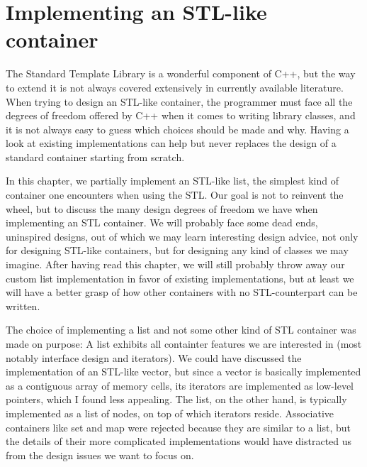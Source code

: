 \chapter{Implementing an STL-like container}
The Standard Template Library is a wonderful component of C++, but the way to extend it is not always covered extensively in currently available literature. When trying to design an STL-like container, the programmer must face all the degrees of freedom offered by C++ when it comes to writing library classes, and it is not always easy to guess which choices should be made and why. Having a look at existing implementations can help but never replaces the design of a standard container starting from scratch.

In this chapter, we partially implement an STL-like list, the simplest kind of container one encounters when using the STL. Our goal is not to reinvent the wheel, but to discuss the many design degrees of freedom we have when implementing an STL container. We will probably face some dead ends, uninspired designs, out of which we may learn interesting design advice, not only for designing STL-like containers, but for designing any kind of classes we may imagine. After having read this chapter, we will still probably throw away our custom list implementation in favor of existing implementations, but at least we will have a better grasp of how other containers with no STL-counterpart can be written.

The choice of implementing a list and not some other kind of STL container was made on purpose: A list exhibits all containter features we are interested in (most notably interface design and iterators). We could have discussed the implementation of an STL-like vector, but since a vector is basically implemented as a contiguous array of memory cells, its iterators are implemented as low-level pointers, which I found less appealing. The list, on the other hand, is typically implemented as a list of nodes, on top of which iterators reside. Associative containers like set and map were rejected because they are similar to a list, but the details of their more complicated implementations would have distracted us from the design issues we want to focus on.

